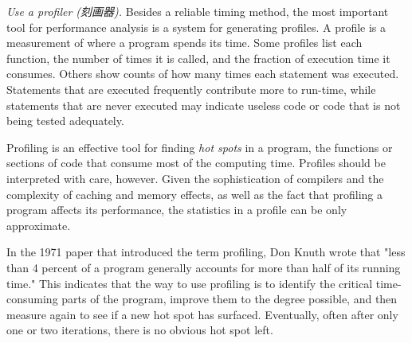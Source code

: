 \emph{Use a profiler (刻画器).} Besides a reliable timing method, the most
important tool for performance analysis is a system for generating
profiles. A profile is a measurement of where a program spends its time.
Some profiles list each function, the number of times it is called, and the
fraction of execution time it consumes. Others show counts of how many
times each statement was executed. Statements that are executed frequently
contribute more to run-time, while statements that are never executed may
indicate useless code or code that is not being tested adequately.

Profiling is an effective tool for finding \textit{hot spots} in a program,
the functions or sections of code that consume most of the computing time.
Profiles should be interpreted with care, however. Given the sophistication
of compilers and the complexity of caching and memory effects, as well as
the fact that profiling a program affects its performance, the statistics
in a profile can be only approximate.

In the 1971 paper that introduced the term profiling, Don Knuth wrote that
"less than 4 percent of a program generally accounts for more than half of
its running time." This indicates that the way to use profiling is to
identify the critical time-consuming parts of the program, improve them to
the degree possible, and then measure again to see if a new hot spot has
surfaced. Eventually, often after only one or two iterations, there is no
obvious hot spot left.

